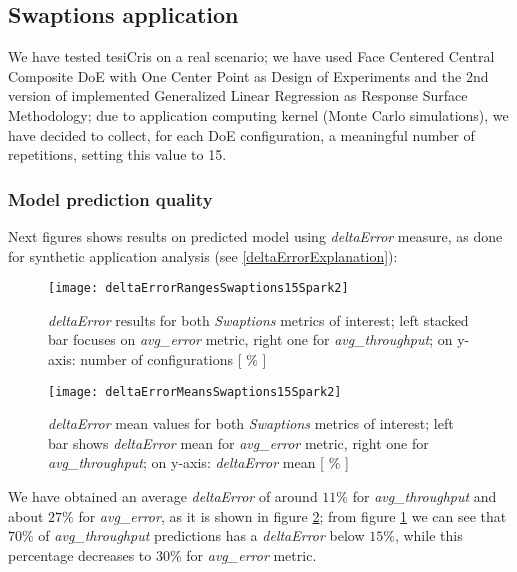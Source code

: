 \subsection{Swaptions application}

We have tested tesiCris on a real scenario; we have used Face Centered Central Composite DoE with One Center Point as Design of Experiments and the 2nd version of implemented Generalized Linear Regression as Response Surface Methodology; due to application computing kernel (Monte Carlo simulations), we have decided to collect, for each DoE configuration, a meaningful number of repetitions, setting this value to 15.


\subsubsection{Model prediction quality}

Next figures shows results on predicted model using \textit{deltaError} measure, as done for synthetic application analysis (see \ref{deltaErrorExplanation}):





\begin{figure}[H]

    \centering
    \texttt{[image: deltaErrorRangesSwaptions15Spark2]}
    \caption{\textit{deltaError} results for both \textit{Swaptions} metrics of interest; left stacked bar focuses on \textit{avg\_error} metric, right one for \textit{avg\_throughput}; on y-axis: number of configurations [ \% ]}
    \label{fig::swaptions15spark2::intervals}
    
\end{figure}

\begin{figure}[H]

    \centering
    \texttt{[image: deltaErrorMeansSwaptions15Spark2]}
    \caption{\textit{deltaError} mean values for both \textit{Swaptions} metrics of interest; left bar shows \textit{deltaError} mean for \textit{avg\_error} metric, right one for \textit{avg\_throughput}; on y-axis: \textit{deltaError} mean [ \% ]}
    \label{fig::swaptions15spark2::means}
    
\end{figure}





We have obtained an average \textit{deltaError} of around $11\%$ for \textit{avg\_throughput} and about $27\%$ for \textit{avg\_error}, as it is shown in figure \ref{fig::swaptions15spark2::means}; from figure \ref{fig::swaptions15spark2::intervals} we can see that $70\%$ of \textit{avg\_throughput} predictions has a \textit{deltaError} below $15\%$, while this percentage decreases to $30\%$ for \textit{avg\_error} metric.


